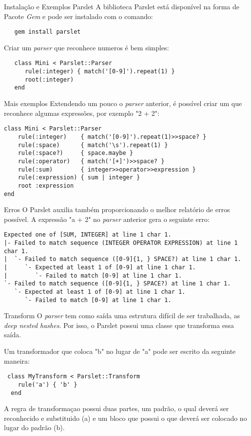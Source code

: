 \documentclass{beamer}
\begin{document}
\begin{frame}[fragile]{Instalação e Exemplos Parslet}
A biblioteca Parslet está disponível na forma de Pacote \textit{Gem} e pode ser instalado com o comando:
\begin{verbatim}
   gem install parslet
\end{verbatim}
Criar um \textit{parser} que reconhece numeros é bem simples:
\begin{verbatim}
   class Mini < Parslet::Parser
      rule(:integer) { match('[0-9]').repeat(1) }
      root(:integer)
   end
\end{verbatim}
\end{frame}

\begin{frame}[fragile]{Mais exemplos}
Extendendo um pouco o \textit{parser} anterior, é possível criar um  que reconhece algumas expressões, por exemplo "2 + 2":
\begin{verbatim}
class Mini < Parslet::Parser
    rule(:integer)    { match('[0-9]').repeat(1)>>space? }
    rule(:space)      { match('\s').repeat(1) }
    rule(:space?)     { space.maybe }
    rule(:operator)   { match('[+]')>>space? }
    rule(:sum)        { integer>>operator>>expression }
    rule(:expression) { sum | integer }
    root :expression
end
\end{verbatim}
\end{frame}

\begin{frame}[fragile]{Erros}
O Parslet auxilia também proporcionando o melhor relatório de erros possível. A expressão "a + 2" no \textit{parser} anterior gera o seguinte erro:
\begin{verbatim}
Expected one of [SUM, INTEGER] at line 1 char 1.
|- Failed to match sequence (INTEGER OPERATOR EXPRESSION) at line 1 char 1.
|  `- Failed to match sequence ([0-9]{1, } SPACE?) at line 1 char 1.
|     `- Expected at least 1 of [0-9] at line 1 char 1.
|        `- Failed to match [0-9] at line 1 char 1.
`- Failed to match sequence ([0-9]{1, } SPACE?) at line 1 char 1.
   `- Expected at least 1 of [0-9] at line 1 char 1.
      `- Failed to match [0-9] at line 1 char 1.
\end{verbatim}
\end{frame}

\begin{frame}[fragile]{Transform}
O \textit{parser} tem como saída uma estrutura difícil de ser trabalhada, as \textit{deep nested hashes}. Por isso, o Parslet possui uma classe que transforma essa saída.

Um transformador que coloca "b" no lugar de "a" pode ser escrito da seguinte maneira:
\begin{verbatim}
 class MyTransform < Parslet::Transform
    rule('a') { 'b' }
  end
\end{verbatim}
A regra de transformaçao possui duas partes, um padrão, o qual deverá ser reconhecido e substituido (a) e um bloco que possui o que deverá ser colocado no lugar do padrão (b).
\end{frame}
\end{document}
